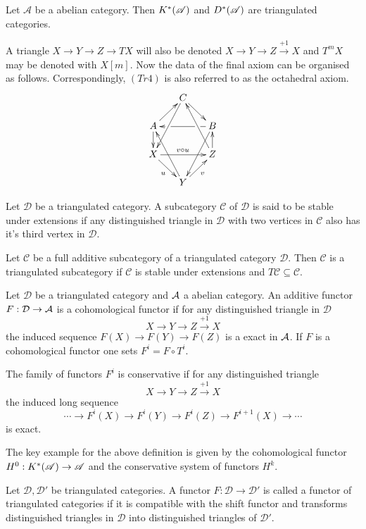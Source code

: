 \begin{proposition}
  Let $\mathcal{A}$ be a abelian category. Then $K^*(\A)$ and $D^*(\A)$ are triangulated categories.
\end{proposition}
A triangle $X\to Y \to Z \to TX$ will also be denoted $X\to Y \to Z \xrightarrow{+1} X$ and $T^m X$ may be denoted with $X[m]$.
Now the data of the final axiom can be organised as follows.
Correspondingly, $(Tr4)$ is also referred to as the octahedral axiom.
\begin{equation*}
\xymatrix@=1.6em{
& C \ar@{->}[dr] \ar[ddl] & \\
A \ar@{->}[ur] \ar[d]& &
    B\ar[ll]|(0.25)\hole|(0.75)\hole
       \ar[ddl] \\
X \ar[rr]^{v \circ u} \ar[dr]_u & &
    Z \ar[u] \ar[uul]\\
& Y \ar[ur]_v \ar[uul]&
}
\end{equation*}
\begin{definition}
  Let $\mathcal{D}$ be a triangulated category. A subcategory $\mathcal{C}$ of $\mathcal{D}$ is said to be stable under extensions if any distinguished triangle in $\mathcal{D}$ with two vertices in $\mathcal{C}$ also has it's third vertex in $\mathcal{D}$.
\end{definition}
\begin{definition}
  Let $\mathcal{C}$ be a full additive subcategory of a triangulated category $\mathcal{D}$. Then $\mathcal{C}$ is a triangulated subcategory if $\mathcal{C}$ is stable under extensions and $T\mathcal{C}\subseteq \mathcal{C}$.
\end{definition}

\begin{definition}
  Let $\mathcal{D}$ be a triangulated category and $\AA$ a abelian category.
  An additive functor $F:\mathcal{D} \to \AA$ is a cohomological functor if for any distinguished triangle in $\mathcal{D}$
  $$X \to Y \to Z\xrightarrow{+1} X $$
  the induced sequence $F(X) \to F(Y) \to F(Z) $
  is a exact in $\AA$. If $F$ is a cohomological functor one sets $F^i = F\circ T^i$.

  The family of functors $F^i$ is conservative if for any distinguished triangle
  $$X \to Y \to Z \xrightarrow{+1} X$$
  the induced long sequence
  $$\cdots \to F^i(X) \to F^i(Y) \to F^i(Z) \to F^{i+1}(X) \to \cdots $$
  is exact.
\end{definition}
The key example for the above definition is given by the cohomological functor $H^0: K^*(\A) \to \A$ and the conservative system of functors $H^k$.
\begin{definition}
  Let $\mathcal{D}, \mathcal{D}'$ be triangulated categories.
  A functor $F:\mathcal{D} \to \mathcal{D}'$ is called a functor of triangulated categories if it is compatible with the shift functor and transforms distinguished triangles in $\mathcal{D}$ into distinguished triangles of $\mathcal{D}'$.
\end{definition}
